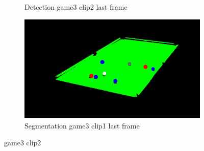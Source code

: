 \begin{figure}[H]
\begin{subfigure}[b]{0.35\textwidth}
        \caption{Detection game3 clip2 last frame}
        \label{fig: game3_clip2_last_frame_detected}
    \end{subfigure}
    \begin{subfigure}[b]{0.35\textwidth}
        \centering
        \includegraphics[width=\textwidth]{images/Segmentation/game3_clip1_segmented_balls_last_frame.jpg}
        \caption{Segmentation game3 clip1 last frame}
		\label{fig: game3_clip1_last_frame_segmented}
    \end{subfigure}
    
	\caption{game3 clip2}
\end{figure}


